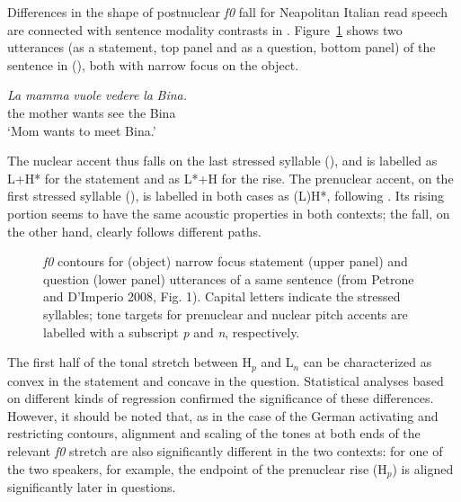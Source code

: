 Differences in the shape of postnuclear \textit{f0} fall for Neapolitan Italian read speech are connected with sentence modality contrasts in \citet{petrone2008tonal}. Figure~\ref{fig210} shows two utterances (as a statement, top panel and as a question, bottom panel) of the sentence in (), both with narrow focus on the object. 

\ea
\gll \textit{La} \textit{mamma} \textit{vuole} \textit{vedere} \textit{la} \textit{Bina.}\\
the mother wants see the Bina\\
\glt ‘Mom wants to meet Bina.’
\z

The nuclear accent thus falls on the last stressed syllable (), and is labelled as L+H* for the statement and as L*+H for the rise. The prenuclear accent, on the first stressed syllable (), is labelled in both cases as (L)H*, following \citet{gilifivela2003tonal,gilifivela2006coding}. Its rising portion seems to have the same acoustic properties in both contexts; the fall, on the other hand, clearly follows different paths.

\begin{figure}
\centering
{}
\caption{\textit{f0} contours for (object) narrow focus statement (upper panel) and question (lower panel) utterances of a same sentence (from Petrone and D'Imperio 2008, Fig. 1). Capital letters indicate the stressed syllables; tone targets for prenuclear and nuclear pitch accents are labelled with a subscript \textit{p} and \textit{n}, respectively.}
\label{fig210}\end{figure}

The first half of the tonal stretch between H$_{p}$ and L$_{n}$ can be characterized as convex in the statement and concave in the question. Statistical analyses based on different kinds of regression confirmed the significance of these differences. However, it should be noted that, as in the case of the German activating and restricting contours, alignment and scaling of the tones at both ends of the relevant \textit{f0} stretch are also significantly different in the two contexts: for one of the two speakers, for example, the endpoint of the prenuclear rise (H$_{p}$) is aligned significantly later in questions. 

